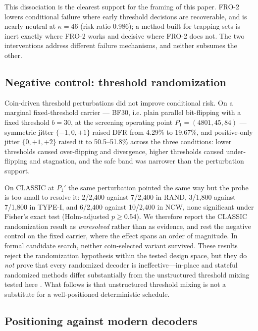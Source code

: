 \documentclass[lettersize,journal]{IEEEtran}
\begin{document}
This dissociation is the clearest support for the framing of this paper. FRO-2 lowers conditional failure where early threshold decisions are recoverable, and is nearly neutral at $\kappa=46$ (risk ratio 0.986); a method built for trapping sets is inert exactly where FRO-2 works and decisive where FRO-2 does not. The two interventions address different failure mechanisms, and neither subsumes the other.

\subsection{Negative control: threshold randomization}\label{sec:negative}

Coin-driven threshold perturbations did not improve conditional risk. On a marginal fixed-threshold carrier --- BF30, i.e. plain parallel bit-flipping with a fixed threshold $b=30$, at the screening operating point $P_1=(4801,45,84)$ --- symmetric jitter $\{-1,0,+1\}$ raised DFR from 4.29\% to 19.67\%, and positive-only jitter $\{0,+1,+2\}$ raised it to 50.5--51.8\% across the three conditions: lower thresholds caused over-flipping and divergence, higher thresholds caused under-flipping and stagnation, and the safe band was narrower than the perturbation support.

On CLASSIC at $P_1'$ the same perturbation pointed the same way but the probe is too small to resolve it: 2/2{,}400 against 7/2{,}400 in RAND, 3/1{,}800 against 7/1{,}800 in TYPE-I, and 6/2{,}400 against 10/2{,}400 in NCW, none significant under Fisher's exact test (Holm-adjusted $p\ge 0.54$). We therefore report the CLASSIC randomization result as \emph{unresolved} rather than as evidence, and rest the negative control on the fixed carrier, where the effect spans an order of magnitude. In formal candidate search, neither coin-selected variant survived. These results reject the randomization hypothesis within the tested design space, but they do \emph{not} prove that every randomized decoder is ineffective---in-place and stateful randomized methods differ substantially from the unstructured threshold mixing tested here \cite{baldi2021inplace}. What follows is that unstructured threshold mixing is not a substitute for a well-positioned deterministic schedule.

\subsection{Positioning against modern decoders}\label{sec:modern}
\end{document}
